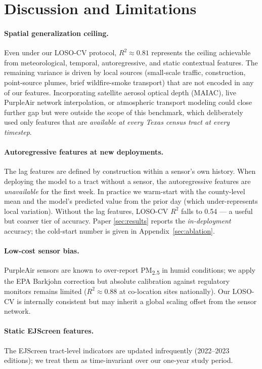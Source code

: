 \documentclass{article}
\begin{document}
\section{Discussion and Limitations}

\paragraph{Spatial generalization ceiling.} Even under our LOSO-CV protocol, $R^2 \approx 0.81$ represents the ceiling achievable from meteorological, temporal, autoregressive, and static contextual features. The remaining variance is driven by local sources (small-scale traffic, construction, point-source plumes, brief wildfire-smoke transport) that are not encoded in any of our features. Incorporating satellite aerosol optical depth (MAIAC), live PurpleAir network interpolation, or atmospheric transport modeling could close further gap but were outside the scope of this benchmark, which deliberately used only features that are \emph{available at every Texas census tract at every timestep}.

\paragraph{Autoregressive features at new deployments.} The lag features are defined by construction within a sensor's own history. When deploying the model to a tract without a sensor, the autoregressive features are \emph{unavailable} for the first week. In practice we warm-start with the county-level mean and the model's predicted value from the prior day (which under-represents local variation). Without the lag features, LOSO-CV $R^2$ falls to 0.54 --- a useful but coarser tier of accuracy. Paper \autoref{sec:results} reports the \emph{in-deployment} accuracy; the cold-start number is given in Appendix~\ref{sec:ablation}.

\paragraph{Low-cost sensor bias.} PurpleAir sensors are known to over-report PM\textsubscript{2.5} in humid conditions; we apply the EPA Barkjohn correction \citep{barkjohn2021} but absolute calibration against regulatory monitors remains limited ($R^2 \approx 0.88$ at co-location sites nationally). Our LOSO-CV is internally consistent but may inherit a global scaling offset from the sensor network.

\paragraph{Static EJScreen features.} The EJScreen tract-level indicators are updated infrequently (\num{2022}--\num{2023} editions); we treat them as time-invariant over our one-year study period.
\end{document}
